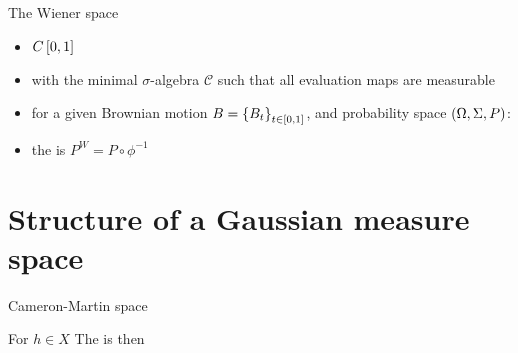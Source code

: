 \documentclass{beamer}
\begin{document}
\begin{frame}{The Wiener space}
    \begin{example}
    \begin{itemize}
        \item $C\intcc{0,1}$ \pause
        \item with the minimal $\sigma$-algebra $\mathcal{C}$ such that all evaluation maps are measurable \pause
        \item for a given Brownian motion $B = \cbr{B_t}_{t\in\intcc{0,1}}$, and probability space $\del{\Omega,\Sigma,P}$:  \pause
        \item the  is $P^W = P\circ\phi^{-1}$
    \end{itemize}    
    \end{example}   
\end{frame}

\section[Structure]{Structure of a Gaussian measure space}
\begin{frame}{Cameron-Martin space}
    \begin{definition}
    For $h\in X$  The  is then 
    \end{definition}
\end{frame}
\end{document}
